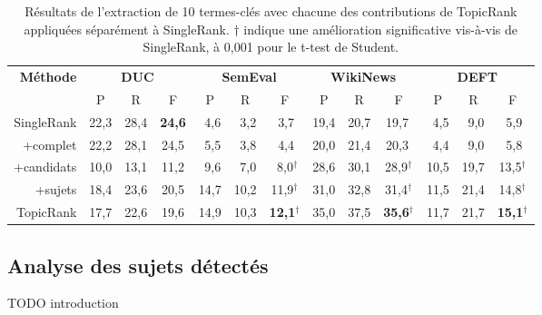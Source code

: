     \begin{table}
      \centering
      \begin{tabular}{@{~}r@{~~}c@{~~}c@{~~}c@{~~}c@{~~}c@{~~}c@{~~}c@{~~}c@{~~}c@{~~}c@{~~}c@{~~}c@{~}}
        \toprule
        \multirow{2}{*}[-2pt]{\textbf{Méthode}} & \multicolumn{3}{c}{\textbf{DUC}} & \multicolumn{3}{c}{\textbf{SemEval}} & \multicolumn{3}{c}{\textbf{WikiNews}} & \multicolumn{3}{c}{\textbf{DEFT}}\\
        \cmidrule(r){2-4}\cmidrule(r){5-7}\cmidrule(r){8-10}\cmidrule{11-13}
        & P & R & F & P & R & F & P & R & F & P & R & F\\
        \midrule
        SingleRank & 22,3 & 28,4 & \textbf{24,6} & $~~$4,6 & $~~$3,2 & $~~$3,7$^{~}$ & 19,4 & 20,7 & 19,7$^{~}$ & $~~$4,5 & $~~$9,0 & $~~$5,9$^{~}$\\
        +complet & 22,2 & 28,1 & 24,5 & $~~$5,5 & $~~$3,8 & $~~$4,4$^{~}$ & 20,0 & 21,4 & 20,3${~}$ & $~~$4,4 & $~~$9,0 & $~~$5,8$^{~}$\\
        +candidats & 10,0 & 13,1 & 11,2 & $~~$9,6 & $~~$7,0 & $~~$8,0$^\dagger$ & 28,6 & 30,1 & 28,9$^\dagger$ & 10,5 & 19,7 & 13,5$^\dagger$\\
        +sujets & 18,4 & 23,6 & 20,5 & 14,7 & 10,2 & 11,9$^\dagger$ & 31,0 & 32,8 & 31,4$^\dagger$ & 11,5 & 21,4 & 14,8$^\dagger$\\
        TopicRank & 17,7 & 22,6 & 19,6 & 14,9 & 10,3 & \textbf{12,1}$^\dagger$ & 35,0 & 37,5 & \textbf{35,6}$^\dagger$ & 11,7 & 21,7 & \textbf{15,1}$^\dagger$\\
        \bottomrule
      \end{tabular}
      \caption{Résultats de l'extraction de 10 termes-clés avec chacune des
               contributions de TopicRank appliquées séparément à SingleRank.
               $\dagger$ indique une amélioration significative vis-à-vis de
               SingleRank, à 0,001 pour le t-test de Student.
               \label{tab:evaluation_individuelle_des_ameliorations}}
    \end{table}

  \subsection{Analyse des sujets détectés}
  \label{subsec:analyse_des_sujets_générés}
    TODO introduction




